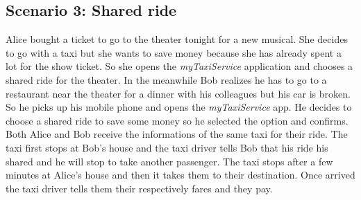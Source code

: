 \subsection{Scenario 3: Shared ride}
Alice bought a ticket to go to the theater tonight for a new musical. She decides to go with a taxi but she wants to save money because she has already spent a lot for the show ticket. So she opens the \textit{myTaxiService} application and chooses a shared ride for the theater.
In the meanwhile Bob realizes he has to go to a restaurant near the theater for a dinner with his colleagues but his car is broken. So he picks up his mobile phone and opens the \textit{myTaxiService} app. He decides to choose a shared ride to save some money so he selected the option and confirms.
Both Alice and Bob receive the informations of the same taxi for their ride. The taxi first stops at Bob's house and the taxi driver tells Bob that his ride his shared and he will stop to take another passenger. The taxi stops after a few minutes at Alice's house and then it takes them to their destination. Once arrived the taxi driver tells them their respectively fares and they pay.